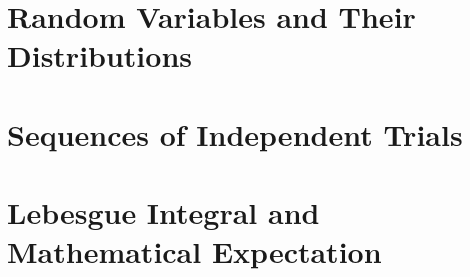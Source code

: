 \documentclass{report}
\begin{document}

\chapter{Random Variables and Their Distributions}

\chapter{Sequences of Independent Trials}

\chapter{Lebesgue Integral and Mathematical Expectation}

\end{document}
